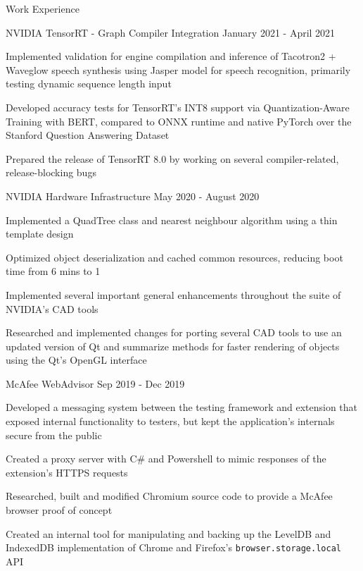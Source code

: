 \documentclass{resume} %
\begin{document}
\begin{rSection}{Work Experience}
    \begin{workexperience}
        {NVIDIA}
        {TensorRT - Graph Compiler Integration}
        {January 2021 - April 2021}
        {
            \item Implemented validation for engine compilation and inference of Tacotron2 + Waveglow speech synthesis using Jasper model for speech recognition, primarily testing dynamic sequence length input
            \item Developed accuracy tests for TensorRT's INT8 support via Quantization-Aware Training with BERT, compared to ONNX runtime and native PyTorch over the Stanford Question Answering Dataset
            \item Prepared the release of TensorRT 8.0 by working on several compiler-related, release-blocking bugs
        }
    \end{workexperience}
    \begin{workexperience}
        {NVIDIA}
        {Hardware Infrastructure}
        {May 2020 - August 2020}
        {
            \item Implemented a QuadTree class and nearest neighbour algorithm using a thin template design
            \item Optimized object deserialization and cached common resources, reducing boot time from 6 mins to 1
            \item Implemented several important general enhancements throughout the suite of NVIDIA's CAD tools
            \item Researched and implemented changes for porting several CAD tools to use an updated version of Qt and summarize methods for faster rendering of objects using the Qt's OpenGL interface
        }
    \end{workexperience}
    
    \begin{workexperience}
        {McAfee}
        {WebAdvisor}
        {Sep 2019 - Dec 2019}
        {
            \item Developed a messaging system between the testing framework and extension that exposed internal functionality to testers, but kept the application's internals secure from the public
            \item Created a proxy server with C\# and Powershell to mimic responses of the extension's HTTPS requests  
            \item Researched, built and modified Chromium source code to provide a McAfee browser proof of concept 
            \item Created an internal tool for manipulating and backing up the LevelDB and IndexedDB implementation of Chrome and Firefox's \texttt{browser.storage.local} API
        }
    \end{workexperience}


\end{rSection}
\end{document}

